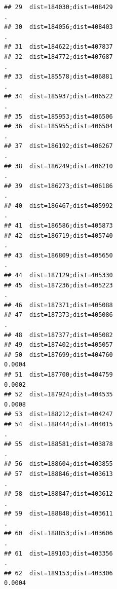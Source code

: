 \documentclass[
]{article}
\begin{document}
\begin{verbatim}
## 29  dist=184030;dist=408429                                              .
## 30  dist=184056;dist=408403                                              .
## 31  dist=184622;dist=407837                                               
## 32  dist=184772;dist=407687                                              .
## 33  dist=185578;dist=406881                                              .
## 34  dist=185937;dist=406522                                              .
## 35  dist=185953;dist=406506                                               
## 36  dist=185955;dist=406504                                              .
## 37  dist=186192;dist=406267                                              .
## 38  dist=186249;dist=406210                                              .
## 39  dist=186273;dist=406186                                              .
## 40  dist=186467;dist=405992                                              .
## 41  dist=186586;dist=405873                                               
## 42  dist=186719;dist=405740                                              .
## 43  dist=186809;dist=405650                                              .
## 44  dist=187129;dist=405330                                               
## 45  dist=187236;dist=405223                                              .
## 46  dist=187371;dist=405088                                               
## 47  dist=187373;dist=405086                                              .
## 48  dist=187377;dist=405082                                               
## 49  dist=187402;dist=405057                                               
## 50  dist=187699;dist=404760                                         0.0004
## 51  dist=187700;dist=404759                                         0.0002
## 52  dist=187924;dist=404535                                         0.0008
## 53  dist=188212;dist=404247                                               
## 54  dist=188444;dist=404015                                              .
## 55  dist=188581;dist=403878                                              .
## 56  dist=188604;dist=403855                                               
## 57  dist=188846;dist=403613                                              .
## 58  dist=188847;dist=403612                                              .
## 59  dist=188848;dist=403611                                              .
## 60  dist=188853;dist=403606                                              .
## 61  dist=189103;dist=403356                                              .
## 62  dist=189153;dist=403306                                         0.0004

\end{verbatim}
\end{document}
